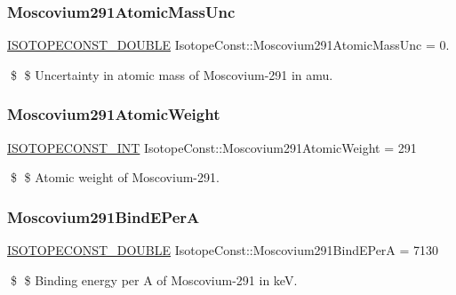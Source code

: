 \subsubsection{\texorpdfstring{Moscovium291\+Atomic\+Mass\+Unc}{Moscovium291AtomicMassUnc}}
{\footnotesize\ttfamily \mbox{\hyperlink{group___isotope_const-_macros_ga8f45a7272ce02c0b4c65c44636ed719a}{I\+S\+O\+T\+O\+P\+E\+C\+O\+N\+S\+T\+\_\+\+D\+O\+U\+B\+LE}} Isotope\+Const\+::\+Moscovium291\+Atomic\+Mass\+Unc = 0.}

\$ \$ Uncertainty in atomic mass of Moscovium-\/291 in amu. \mbox{\label{group___isotope_const-_moscovium-_mc291_ga2cac54a4bbcd1e379fab544dc83bf0a1}} 
\subsubsection{\texorpdfstring{Moscovium291\+Atomic\+Weight}{Moscovium291AtomicWeight}}
{\footnotesize\ttfamily \mbox{\hyperlink{group___isotope_const-_macros_ga5f18360b3e99483a35c32d789e62621c}{I\+S\+O\+T\+O\+P\+E\+C\+O\+N\+S\+T\+\_\+\+I\+NT}} Isotope\+Const\+::\+Moscovium291\+Atomic\+Weight = 291}

\$ \$ Atomic weight of Moscovium-\/291. \mbox{\label{group___isotope_const-_moscovium-_mc291_ga203a6e7920db3041350980a13238ac6b}} 
\subsubsection{\texorpdfstring{Moscovium291\+Bind\+E\+PerA}{Moscovium291BindEPerA}}
{\footnotesize\ttfamily \mbox{\hyperlink{group___isotope_const-_macros_ga8f45a7272ce02c0b4c65c44636ed719a}{I\+S\+O\+T\+O\+P\+E\+C\+O\+N\+S\+T\+\_\+\+D\+O\+U\+B\+LE}} Isotope\+Const\+::\+Moscovium291\+Bind\+E\+PerA = 7130}

\$ \$ Binding energy per A of Moscovium-\/291 in keV. \mbox{\label{group___isotope_const-_moscovium-_mc291_gaf3f0296499480731a3f3a9bc6fe742e1}} 
